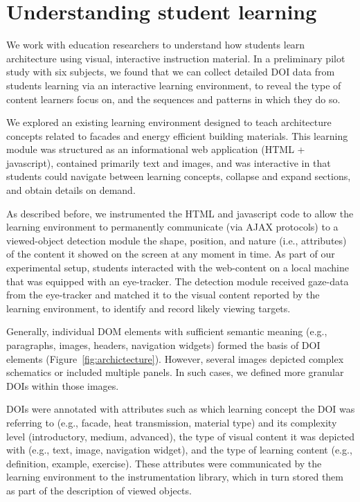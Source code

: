 \section{Understanding student learning}

We work with education researchers to understand how students learn architecture using visual, interactive instruction material. In a preliminary pilot study with six subjects, we found that we can collect detailed DOI data from students learning via an interactive learning environment, to reveal the type of content learners focus on, and the sequences and patterns in which they do so. 

We explored an existing learning environment designed to teach architecture concepts related to facades and energy efficient building materials. This learning module was structured as an informational web application (HTML + javascript), contained primarily text and images, and was interactive in that students could navigate between learning concepts, collapse and expand sections, and obtain details on demand. 

As described before, we instrumented the HTML and javascript code to allow the learning environment to permanently communicate (via AJAX protocols) to a viewed-object detection module the shape, position, and nature (i.e., attributes) of the content it showed on the screen at any moment in time. As part of our experimental setup, students interacted with the web-content on a local machine that was equipped with an eye-tracker. The detection module received gaze-data from the eye-tracker and matched it to the visual content reported by the learning environment, to identify and record likely viewing targets.

Generally, individual DOM elements with sufficient semantic meaning (e.g., paragraphs, images, headers, navigation widgets) formed the basis of DOI elements (Figure~\ref{fig:archictecture}). However, several images depicted complex schematics or included multiple panels. In such cases, we defined more granular DOIs within those images. 

DOIs were annotated with attributes such as which learning concept the DOI was referring to (e.g., facade, heat transmission, material type) and its complexity level (introductory, medium, advanced), the type of visual content it was depicted with (e.g., text, image, navigation widget), and the type of learning content (e.g., definition, example, exercise). These attributes were communicated by the learning environment to the instrumentation library, which in turn stored them as part of the description of viewed objects.

